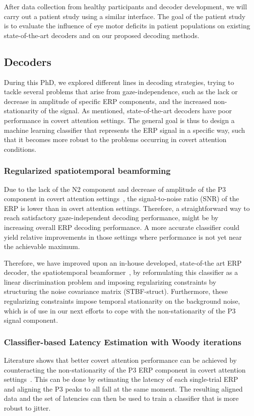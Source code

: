 After data collection from healthy participants and decoder development, we
will carry out a patient study using a similar interface.
The goal of the patient study is to evaluate the influence of eye motor
deficits in patient populations on existing state-of-the-art decoders and on
our proposed decoding methods.

\subsection{Decoders}

During this PhD, we explored different lines in decoding strategies,
trying to tackle several problems that arise from gaze-independence, such as
the lack or decrease in amplitude of specific ERP components, and the increased
non-stationarity of the signal.
As mentioned, state-of-the-art decoders have poor performance in covert attention
settings.
The general goal is thus to design a machine learning classifier that represents
the ERP signal in a specific way, such that it becomes more robust to the problems
occurring in covert attention conditions.

\subsubsection{Regularized spatiotemporal beamforming}
Due to the lack of the N2 component and decrease of amplitude of the
P3 component in covert attention
settings~\cite{Treder2010}, the signal-to-noise ratio (SNR) of
the ERP is lower than in overt attention settings.
Therefore, a straightforward way to reach satisfactory
gaze-independent decoding performance, might be by increasing overall ERP
decoding performance. A more accurate classifier could yield relative
improvements in those settings where performance is not yet near the achievable
maximum.

Therefore, we have improved upon an in-house developed, state-of-the art ERP
decoder, the spatiotemporal beamformer~\cite{Wittevrongel2016}, by reformulating
this classifier as a linear discrimination problem and
imposing regularizing constraints by structuring the noise covariance matrix
(STBF-struct).
Furthermore, these regularizing constraints impose temporal stationarity on
the background noise, which is of use in our next efforts to cope with the
non-stationarity of the P3 signal component.

\subsubsection{Classifier-based Latency Estimation with Woody iterations}
Literature shows that better covert attention performance can be achieved by
counteracting the non-stationarity of the P3 ERP component in covert
attention settings~\cite{Arico2014}.
This can be done by estimating the latency of each single-trial ERP and aligning
the P3 peaks to all fall at the same moment.
The resulting aligned data and the set of latencies can then be used to train a
classifier that is more robust to jitter.

